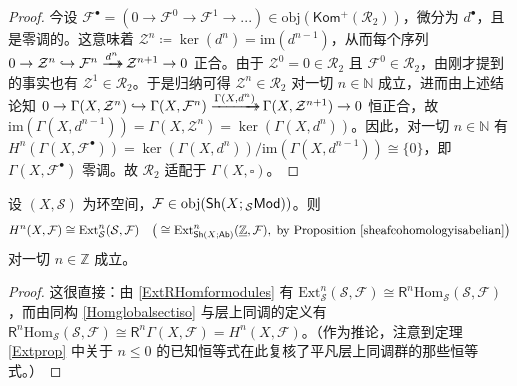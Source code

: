\begin{proof}
今设 $\mathcal{F}^\bullet=(0\rightarrow\mathcal{F}^0\rightarrow\mathcal{F}^1\rightarrow...)\in\text{obj}(\mathsf{Kom^+}(\mathcal{R}_2))$，微分为 $d^\bullet$，且是零调的。这意味着 $\mathcal{Z}^n\coloneqq\ker(d^n)=\text{im}(d^{n-1})$，从而每个序列 $0\rightarrow\mathcal{Z}^n\hookrightarrow\mathcal{F}^n\xrightarrow{d^n}\mkern-20mu\rightarrow\mathcal{Z}^{n+1}\rightarrow 0$ 正合。由于 $\mathcal{Z}^0=0\in\mathcal{R}_2$ 且 $\mathcal{F}^0\in\mathcal{R}_2$，由刚才提到的事实也有 $\mathcal{Z}^1\in\mathcal{R}_2$。于是归纳可得 $\mathcal{Z}^n\in\mathcal{R}_2$ 对一切 $n\in\mathbb{N}$ 成立，进而由上述结论知 $0\rightarrow\Gamma(X,\mathcal{Z}^n)\hookrightarrow\Gamma(X,\mathcal{F}^n)\xrightarrow{\Gamma(X,d^n)}\mkern-20mu\rightarrow\Gamma(X,\mathcal{Z}^{n+1})\rightarrow 0$ 恒正合，故 $\text{im}(\Gamma(X,d^{n-1}))=\Gamma(X,\mathcal{Z}^n)=\ker(\Gamma(X,d^n))$。因此，对一切 $n\in\mathbb{N}$ 有 $H^n(\Gamma(X,\mathcal{F}^\bullet))=\ker(\Gamma(X,d^n))/\text{im}(\Gamma(X,d^{n-1}))\cong\{0\}$，即 $\Gamma(X,\mathcal{F}^\bullet)$ 零调。故 $\mathcal{R}_2$ 适配于 $\Gamma(X,\square)$。    
\end{proof}

\begin{Lem}\label{sheafcohomthroughext}
设 $(X,\mathcal{S})$ 为环空间，$\mathcal{F}\in\textup{obj}(\mathsf{Sh}(X;{}_{\mathcal{S}}\mathsf{Mod}))$。则
\[
H^n(X,\mathcal{F})\cong\textup{Ext}_{\mathcal{S}}^n(\mathcal{S},\mathcal{F})\quad\textup{\big(}\cong\textup{Ext}_{\mathsf{Sh}(X;\mathsf{Ab})}^n(\underline{\mathbb{Z}},\mathcal{F}),\;\text{by Proposition \ref{sheafcohomologyisabelian}}\textup{\big)}
\]
对一切 $n\in\mathbb{Z}$ 成立。
\end{Lem}

\begin{proof}
这很直接：由 \eqref{ExtRHomformodules} 有 $\text{Ext}_{\mathcal{S}}^n(\mathcal{S},\mathcal{F})\cong\mathsf{R}^n\text{Hom}_{\mathcal{S}}(\mathcal{S},\mathcal{F})$，而由同构 \eqref{Homglobalsectiso} 与层上同调的定义有 $\mathsf{R}^n\text{Hom}_{\mathcal{S}}(\mathcal{S},\mathcal{F})\cong \mathsf{R}^n\Gamma(X,\mathcal{F})=H^n(X,\mathcal{F})$。（作为推论，注意到定理 \ref{Extprop} 中关于 $n\leq 0$ 的已知恒等式在此复核了平凡层上同调群的那些恒等式。）
\end{proof}

